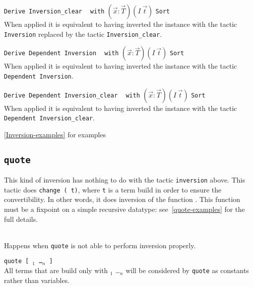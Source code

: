 \begin{Variants}
\item \texttt{Derive Inversion\_clear} \ident~ \texttt{with}
  $(\vec{x}:\vec{T})(I~\vec{t})$ \texttt{Sort} \sort~ \\ 
  When applied it is equivalent to having
  inverted the instance with the tactic \texttt{Inversion}
  replaced by the tactic \texttt{Inversion\_clear}.
\item \texttt{Derive Dependent Inversion} \ident~ \texttt{with}
  $(\vec{x}:\vec{T})(I~\vec{t})$ \texttt{Sort} \sort~\\
  When applied it is equivalent to having
  inverted the instance with the tactic \texttt{Dependent Inversion}.
\item \texttt{Derive Dependent Inversion\_clear} \ident~ \texttt{with}
  $(\vec{x}:\vec{T})(I~\vec{t})$ \texttt{Sort} \sort~\\
  When applied it is equivalent to having
  inverted the instance with the tactic \texttt{Dependent Inversion\_clear}.
\end{Variants}

\SeeAlso \ref{Inversion-examples} for examples

\subsection{\tt quote \ident}

This kind of inversion has nothing to do with the tactic
\texttt{inversion} above. This tactic does \texttt{change (\ident\
  t)}, where \texttt{t} is a term build in order to ensure the
convertibility. In other words, it does inversion of the function
\ident. This function must be a fixpoint on a simple recursive
datatype: see~\ref{quote-examples} for the full details.

\begin{ErrMsgs}
\item {}\\
  Happens when \texttt{quote} is not able to perform inversion properly.
\end{ErrMsgs}

\begin{Variants}
\item \texttt{quote {\ident} [ \ident$_1$ \dots \ident$_n$ ]}\\
  All terms that are build only with \ident$_1$ \dots \ident$_n$ will be
  considered by \texttt{quote} as constants rather than variables.
\end{Variants}

